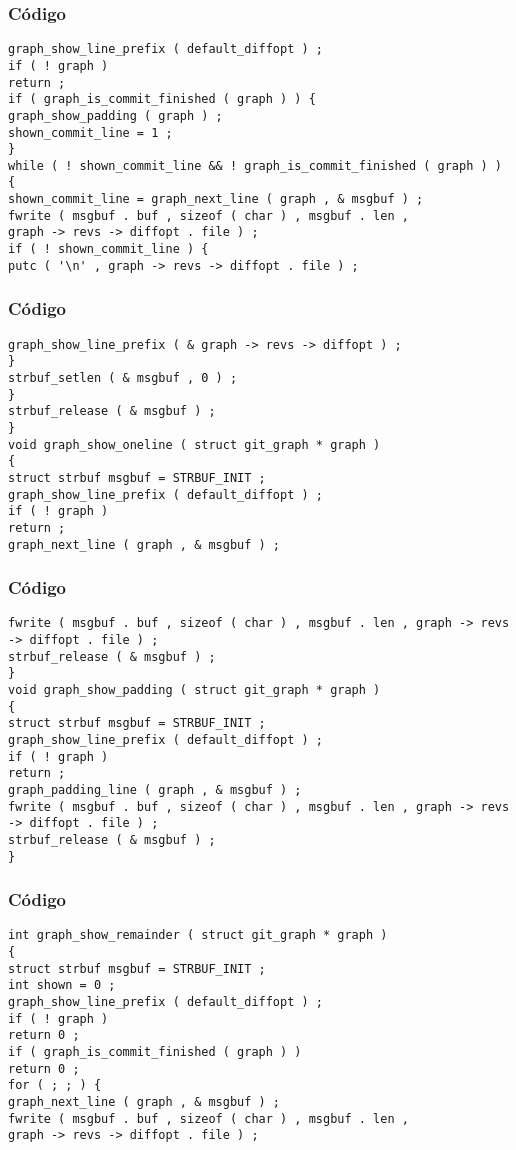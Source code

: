 \documentclass{beamer}
\begin{document}
\begin{frame}[fragile]
\frametitle{C\'odigo}
\begin{verbatim}
graph_show_line_prefix ( default_diffopt ) ; 
if ( ! graph ) 
return ; 
if ( graph_is_commit_finished ( graph ) ) { 
graph_show_padding ( graph ) ; 
shown_commit_line = 1 ; 
} 
while ( ! shown_commit_line && ! graph_is_commit_finished ( graph ) ) { 
shown_commit_line = graph_next_line ( graph , & msgbuf ) ; 
fwrite ( msgbuf . buf , sizeof ( char ) , msgbuf . len , 
graph -> revs -> diffopt . file ) ; 
if ( ! shown_commit_line ) { 
putc ( '\n' , graph -> revs -> diffopt . file ) ; 
\end{verbatim}
\end{frame}
\begin{frame}[fragile]
\frametitle{C\'odigo}
\begin{verbatim}
graph_show_line_prefix ( & graph -> revs -> diffopt ) ; 
} 
strbuf_setlen ( & msgbuf , 0 ) ; 
} 
strbuf_release ( & msgbuf ) ; 
} 
void graph_show_oneline ( struct git_graph * graph ) 
{ 
struct strbuf msgbuf = STRBUF_INIT ; 
graph_show_line_prefix ( default_diffopt ) ; 
if ( ! graph ) 
return ; 
graph_next_line ( graph , & msgbuf ) ; 
\end{verbatim}
\end{frame}
\begin{frame}[fragile]
\frametitle{C\'odigo}
\begin{verbatim}
fwrite ( msgbuf . buf , sizeof ( char ) , msgbuf . len , graph -> revs -> diffopt . file ) ; 
strbuf_release ( & msgbuf ) ; 
} 
void graph_show_padding ( struct git_graph * graph ) 
{ 
struct strbuf msgbuf = STRBUF_INIT ; 
graph_show_line_prefix ( default_diffopt ) ; 
if ( ! graph ) 
return ; 
graph_padding_line ( graph , & msgbuf ) ; 
fwrite ( msgbuf . buf , sizeof ( char ) , msgbuf . len , graph -> revs -> diffopt . file ) ; 
strbuf_release ( & msgbuf ) ; 
} 
\end{verbatim}
\end{frame}
\begin{frame}[fragile]
\frametitle{C\'odigo}
\begin{verbatim}
int graph_show_remainder ( struct git_graph * graph ) 
{ 
struct strbuf msgbuf = STRBUF_INIT ; 
int shown = 0 ; 
graph_show_line_prefix ( default_diffopt ) ; 
if ( ! graph ) 
return 0 ; 
if ( graph_is_commit_finished ( graph ) ) 
return 0 ; 
for ( ; ; ) { 
graph_next_line ( graph , & msgbuf ) ; 
fwrite ( msgbuf . buf , sizeof ( char ) , msgbuf . len , 
graph -> revs -> diffopt . file ) ; 
\end{verbatim}
\end{frame}
\end{document}
